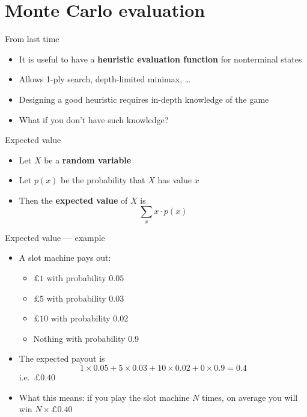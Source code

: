 \part{Monte Carlo evaluation}
\frame{\partpage}

\begin{frame}{From last time}
	\begin{itemize}
		\pause\item It is useful to have a \textbf{heuristic evaluation function} for nonterminal states
		\pause\item Allows 1-ply search, depth-limited minimax, \dots
		\pause\item Designing a good heuristic requires in-depth knowledge of the game
		\pause\item What if you don't have such knowledge?
	\end{itemize}
\end{frame}

\begin{frame}{Expected value}
	\begin{itemize}
		\pause\item Let $X$ be a \textbf{random variable}
		\pause\item Let $p(x)$ be the probability that $X$ has value $x$
		\pause\item Then the \textbf{expected value} of $X$ is
			$$ \sum_x x \cdot p(x) $$
	\end{itemize}
\end{frame}

\begin{frame}{Expected value --- example}
	\begin{itemize}
		\pause\item A slot machine pays out:
			\begin{itemize}
				\pause\item $\pounds 1$ with probability $0.05$
				\pause\item $\pounds 5$ with probability $0.03$
				\pause\item $\pounds 10$ with probability $0.02$
				\pause\item Nothing with probability $0.9$
			\end{itemize}
		\pause\item The expected payout is
			$$ 1 \times 0.05 + 5 \times 0.03 + 10 \times 0.02 + 0 \times 0.9
				= 0.4 $$
			i.e.\ $\pounds 0.40$
		\pause\item What this means: if you play the slot machine $N$ times, on average you will win $N \times \pounds 0.40$
	\end{itemize}
\end{frame}

